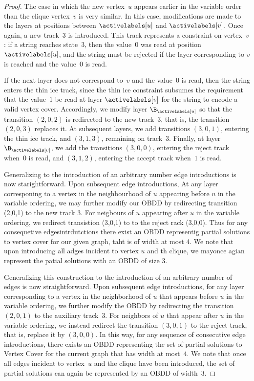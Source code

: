 \begin{proof}
The case in which the new vertex~$u$ appears earlier in the variable order than
the clique vertex~$v$ is very similar. In this case, modifications are made to
the layers at positions between $\activelabels[u]$ and $\activelabels[v]$. Once
again, a new track~$3$ is introduced. This track represents a constraint on
vertex~$v$: if a string reaches state~$3$, then the value~$0$ was read at position
$\activelabels[u]$, and the string must be rejected if the layer corresponding to
$v$ is reached and the value~$0$ is read.

If the next layer does not correspond to~$v$ and the value~$0$ is read, then the
string enters the thin ice track, since the thin ice constraint subsumes the
requirement that the value~$1$ be read at layer $\activelabels[v]$ for the string
to encode a valid vertex cover. Accordingly, we modify layer
$\B_{\activelabels[u]}$ so that the transition $(2,0,2)$ is redirected to the new
track~$3$, that is, the transition $(2,0,3)$ replaces it. At subsequent layers,
we add transitions $(3,0,1)$, entering the thin ice track, and $(3,1,3)$,
remaining on track~$3$. Finally, at layer $\B_{\activelabels[v]}$, we add the
transitions $(3,0,0)$, entering the reject track when~$0$ is read, and $(3,1,2)$,
entering the accept track when~$1$ is read.

Generalizing to the introduction of an arbitrary number edge introductions is now starightforward. Upon subsequent edge introductions, At any layer corresponing to a vertex in the neighbourhood of $u$ appearing before $u$ in the variable ordering, we may further modify our OBDD by redirecting transition (2,0,1) to the new track 3. For neigbours of $u$ appearing after $u$ in the variable ordering, we redirect transistion (3,0,1) to to the reject rack (3,0,0). Thus for any consequetive edgesintrdutctions there exist an OBDD representig partial solutions to vertex cover for our given graph, taht is of width at most 4. We note that upon introducing all adges incident to vertex $u$ and th clique, we mayonce agian represent the patial solutions with an OBDD of size 3.

Generalizing this construction to the introduction of an arbitrary number of
edges is now straightforward. Upon subsequent edge introductions, for any layer
corresponding to a vertex in the neighborhood of $u$ that appears before $u$ in
the variable ordering, we further modify the OBDD by redirecting the transition
$(2,0,1)$ to the auxiliary track~$3$. For neighbors of $u$ that appear after $u$
in the variable ordering, we instead redirect the transition $(3,0,1)$ to the
reject track, that is, replace it by $(3,0,0)$. In this way, for any sequence of
consecutive edge introductions, there exists an OBDD representing the set of
partial solutions to {\sc Vertex Cover} for the current graph that has width at
most~$4$. We note that once all edges incident to vertex~$u$ and the clique have
been introduced, the set of partial solutions can again be represented by an
OBDD of width~$3$.


\end{proof}
